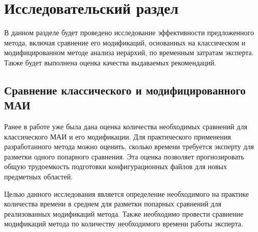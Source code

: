 \chapter{Исследовательский раздел}
В данном разделе будет проведено исследование  эффективности предложенного метода, включая сравнение его модификаций, основанных на классическом и модифицированном методе анализа иерархий, по временным затратам эксперта. Также будет выполнена оценка качества выдаваемых рекомендаций.
\section{Сравнение классического и модифицированного МАИ}

Ранее в работе уже была дана оценка количества необходимых сравнений для классического МАИ и его модификации. 
Для практического применения разработанного метода можно оценить, сколько времени требуется эксперту для разметки одного попарного сравнения.
Эта оценка позволяет прогнозировать общую трудоемкость подготовки конфигурационных файлов для новых предметных областей.

Целью данного исследования является определение необходимого на практике количества времени в среднем для разметки попарных сравнений для реализованных модификаций метода. 
Также необходимо провести сравнение модификаций метода по количеству необходимого времени работы эксперта.


